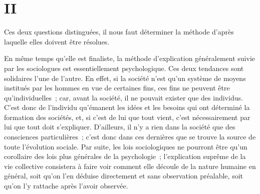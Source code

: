 \documentclass[french,twoside]{book} %
\begin{document}
\section[{II}]{II}
\noindent Ces deux questions distinguées, il nous faut déterminer la méthode d’après laquelle elles doivent être résolues.\par
En même temps qu’elle est finaliste, la méthode d’explication généralement suivie par les sociologues est essentiellement psychologique. Ces deux tendances sont solidaires l’une de l’autre. En effet, si la société n’est qu’un système de moyens institués par les hommes en vue de certaines fins, ces fins ne peuvent être qu’individuelles ; car, avant la société, il ne pouvait exister que des individus. C’est donc de l’individu qu’émanent les idées et les besoins qui ont déterminé la formation des sociétés, et, si c’est de lui que tout vient, c’est nécessairement par lui que tout doit s’expliquer. D’ailleurs, il n’y a rien dans la société que des consciences particulières ; c’est donc dans ces dernières que se trouve la source de toute l’évolution sociale. Par suite, les lois sociologiques ne pourront être qu’un corollaire des lois plus générales de la psychologie ; l’explication suprême de la vie collective consistera à faire voir comment elle découle de la nature humaine en général, soit qu’on l’en déduise directement et sans observation préalable, soit qu’on l’y rattache après l’avoir observée.\par
\end{document}
